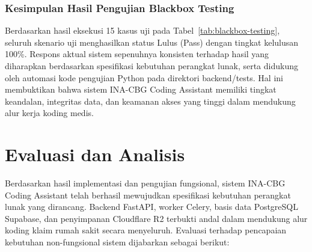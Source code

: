 \subsubsection{Kesimpulan Hasil Pengujian Blackbox Testing}
Berdasarkan hasil eksekusi 15 kasus uji pada Tabel~\ref{tab:blackbox-testing}, seluruh skenario uji menghasilkan status Lulus (Pass) dengan tingkat kelulusan 100\%. Respons aktual sistem sepenuhnya konsisten terhadap hasil yang diharapkan berdasarkan spesifikasi kebutuhan perangkat lunak, serta didukung oleh automasi kode pengujian Python pada direktori backend/tests. Hal ini membuktikan bahwa sistem INA-CBG Coding Assistant memiliki tingkat keandalan, integritas data, dan keamanan akses yang tinggi dalam mendukung alur kerja koding medis.

\section{Evaluasi dan Analisis}
Berdasarkan hasil implementasi dan pengujian fungsional, sistem INA-CBG Coding Assistant telah berhasil mewujudkan spesifikasi kebutuhan perangkat lunak yang dirancang. Backend FastAPI, worker Celery, basis data PostgreSQL Supabase, dan penyimpanan Cloudflare R2 terbukti andal dalam mendukung alur koding klaim rumah sakit secara menyeluruh. Evaluasi terhadap pencapaian kebutuhan non-fungsional sistem dijabarkan sebagai berikut:

